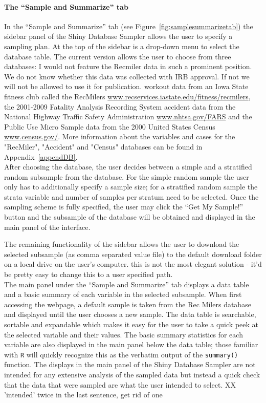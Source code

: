\documentclass{article}\usepackage[]{graphicx}\usepackage[]{color}
\newcommand{\hh}[1]{{\color{ForestGreen} #1}}
\begin{document}
\paragraph{The ``Sample and Summarize'' tab} \hfill\newline

In the ``Sample and Summarize'' tab  (see Figure~\ref{fig:samplesummarizetab})  the sidebar panel of the Shiny Database Sampler allows the user to specify a sampling plan.  At the top of the sidebar is a drop-down menu to select the database table.
The current version allows the user to choose from three databases: 
\hh{I would not feature the Recmiler data in such a prominent position. We do not know whether this data was collected with IRB approval. If not we will not be allowed to use it for publication.  }
 workout data from an Iowa State fitness club called the RecMilers \url{www.recservices.iastate.edu/fitness/recmilers}, the 2001-2009 Fatality Analysis Recording System accident data from the National Highway Traffic Safety Administration \url{www.nhtsa.gov/FARS} and the Public Use Micro Sample data from the 2000 United States Census \url{www.census.gov/}.  More information about the variables and cases for the "RecMiler", "Accident" and "Census" databases can be found in Appendix~\ref{appendDB}. \\  


After choosing the database, 
the user decides between a simple and a stratified random subsample from the database. 
For the simple random sample the user only has to additionally specify a sample size;
for a stratified random sample the strata variable and number of samples per stratum need to be selected.  
Once the sampling scheme is fully specified, the user may click the ``Get My Sample!'' button and the subsample of the database will be obtained and displayed in the main panel of the interface.  


The remaining functionality of the sidebar allows the user to download the selected subsample (as comma separated value file)  to the default download folder on a local drive  on the user's computer. \hh{this is not the most elegant solution - it'd be pretty easy to change this to a user specified path.}
\\  

 The main panel under the ``Sample and Summarize'' tab displays a data table and a basic summary of each variable in the selected subsample.  When first accessing the webpage, a default sample is taken from the Rec Milers database and displayed until the user chooses a new sample.
 The data table is searchable, sortable and expandable which makes it easy for the user to take a quick peek at the selected variable and their values.  The basic summary statistics for each variable are also displayed in the main panel below the data table; those familiar with \texttt{R}  will quickly recognize this as the verbatim output of the \texttt{summary()} function.  The displays in the main panel of the Shiny Database Sampler are not intended for any extensive analysis of the sampled data but instead a quick check that the data that were sampled are what the user intended to select. \hh{XX 'intended' twice in the last sentence, get rid of one} \\ 
\end{document}
